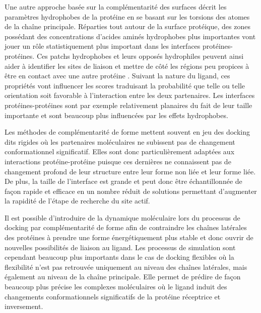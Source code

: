 Une autre approche basée sur la complémentarité des surfaces décrit les paramètres hydrophobes de la protéine en se basant sur les torsions des atomes de la chaîne principale. Réparties tout autour de la surface protéique, des zones possédant des concentrations d'acides aminés hydrophobes plus importantes vont jouer un rôle statistiquement plus important dans les interfaces protéines-protéines. Ces patchs hydrophobes et leurs opposés hydrophiles peuvent ainsi aider à identifier les sites de liaison et mettre de côté les régions peu propices à être en contact avec une autre protéine \cite{jones1996principles}. Suivant la nature du ligand, ces propriétés vont influencer les scores traduisant la probabilité que telle ou telle orientation soit favorable à l'interaction entre les deux partenaires. Les interfaces protéines-protéines sont par exemple relativement planaires du fait de leur taille importante et sont beaucoup plus influencées par les effets hydrophobes.

Les méthodes de complémentarité de forme mettent souvent en jeu des docking dits rigides où les partenaires moléculaires ne subissent pas de changement conformationnel significatif. Elles sont donc particulièrement adaptées aux interactions protéine-protéine puisque ces dernières ne connaissent pas de changement profond de leur structure entre leur forme non liée et leur forme liée. De plus, la taille de l'interface est grande et peut donc être échantillonnée de façon rapide et efficace en un nombre réduit de solutions permettant d'augmenter la rapidité de l'étape de recherche du site actif. 

Il est possible d'introduire de la dynamique moléculaire lors du processus de docking par complémentarité de forme afin de contraindre les chaînes latérales des protéines à prendre une forme énergétiquement plus stable et donc ouvrir de nouvelles possibilités de liaison au ligand.
Les processus de simulation sont cependant beaucoup plus importants dans le cas de docking flexibles où la flexibilité n'est pas retrouvée uniquement au niveau des chaînes latérales, mais également au niveau de la chaîne principale. Elle permet de prédire de façon beaucoup plus précise les complexes moléculaires où le ligand induit des changements conformationnels significatifs de la protéine réceptrice et inversement.


